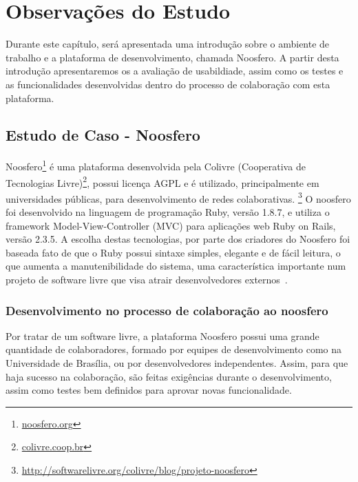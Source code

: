 \chapter{Observações do Estudo}

Durante este capítulo, será apresentada uma introdução sobre o ambiente de trabalho e a plataforma de desenvolvimento, chamada Noosfero. A partir desta introdução apresentaremos os a avaliação de usabildiade, assim como os testes e as funcionalidades desenvolvidas dentro do processo de colaboração com esta plataforma.

\section{Estudo de Caso - Noosfero}

Noosfero\footnote{\url{noosfero.org}} é uma plataforma desenvolvida pela Colivre (Cooperativa de Tecnologias Livre)\footnote{\url{colivre.coop.br}}, possui licença AGPL e é utilizado, principalmente em universidades públicas, para desenvolvimento de redes colaborativas. \footnote{\url{http://softwarelivre.org/colivre/blog/projeto-noosfero}}
%
O noosfero foi desenvolvido na linguagem de programação Ruby, versão 1.8.7, e utiliza
o framework Model-View-Controller (MVC) para aplicações web Ruby on Rails, versão 
2.3.5. A escolha destas tecnologias, por parte dos criadores do Noosfero foi baseada 
fato de que o Ruby possui sintaxe simples, elegante e de fácil leitura, o que aumenta
a manutenibilidade do sistema, uma característica importante num projeto de software
livre que visa atrair desenvolvedores externos~\cite{meirelles2013}.

\subsection{Desenvolvimento no processo de colaboração ao noosfero}

Por tratar de um software livre, a plataforma Noosfero possui uma grande quantidade 
de colaboradores, formado por equipes de desenvolvimento como na Universidade de 
Brasília, ou por desenvolvedores independentes. Assim, para que haja sucesso na 
colaboração, são feitas exigências durante o desenvolvimento, assim como testes 
bem definidos para aprovar novas funcionalidade.

